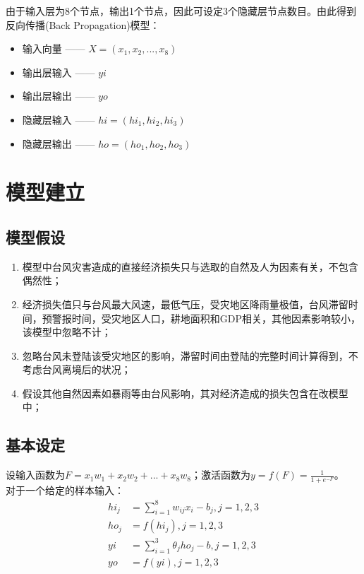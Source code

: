 \documentclass[12pt]{article}
\begin{document}
\indent 由于输入层为8个节点，输出1个节点，因此可设定3个隐藏层节点数目。由此得到反向传播(Back Propagation)模型：

\begin{itemize}
\item 输入向量 —— $X = (x_1, x_2, ..., x_8)$
\item 输出层输入 —— $yi$
\item 输出层输出 —— $yo$
\item 隐藏层输入 —— $hi = (hi_1, hi_2, hi_3)$
\item 隐藏层输出 —— $ho = (ho_1, ho_2, ho_3)$
\end{itemize}

\clearpage

\section{模型建立}

\subsection{模型假设}

\begin{enumerate}
\item 模型中台风灾害造成的直接经济损失只与选取的自然及人为因素有关，不包含偶然性；
\item 经济损失值只与台风最大风速，最低气压，受灾地区降雨量极值，台风滞留时间，预警报时间，受灾地区人口，耕地面积和GDP相关，其他因素影响较小，该模型中忽略不计；
\item 忽略台风未登陆该受灾地区的影响，滞留时间由登陆的完整时间计算得到，不考虑台风离境后的状况；
\item 假设其他自然因素如暴雨等由台风影响，其对经济造成的损失包含在改模型中；
\end{enumerate}

\subsection{基本设定}

设输入函数为$F = x_1 w_1 + x_2 w_2 + ... + x_8 w_8$；激活函数为$y = f(F) = \frac{1}{1 + e^{-F}}$。\\

\indent 对于一个给定的样本输入：\\

\begin{align}
hi_j &= \sum_{i=1}^8 w_{ij} x_i - b_j, j = 1, 2, 3\\
ho_j &= f(hi_j), j = 1, 2, 3\\
yi &= \sum_{i=1}^3 \theta_j ho_j - b, j = 1, 2, 3\\
yo &= f(yi), j = 1, 2, 3
\end{align}
\end{document}
